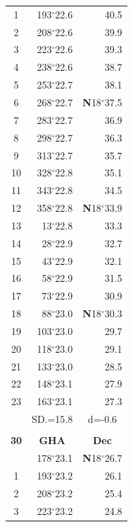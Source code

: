 \documentclass[10pt, a4paper]{report}
\begin{document}
\begin{scriptsize}
\begin{tabular*}{0.2\textwidth}[t]{@{\extracolsep{\fill}}|c|rr|}
1 & 193$^\circ$22.6 & 40.5\\
2 & 208$^\circ$22.6 & 39.9\\
3 & 223$^\circ$22.6 & \raisebox{0.24ex}{\boldmath$\cdot$~\boldmath$\cdot$~~}39.3\\
4 & 238$^\circ$22.6 & 38.7\\
5 & 253$^\circ$22.7 & 38.1\\[2Pt]
6 & 268$^\circ$22.7 & \textbf{N}18$^\circ$37.5\\
7 & 283$^\circ$22.7 & 36.9\\
8 & 298$^\circ$22.7 & 36.3\\
9 & 313$^\circ$22.7 & \raisebox{0.24ex}{\boldmath$\cdot$~\boldmath$\cdot$~~}35.7\\
10 & 328$^\circ$22.8 & 35.1\\
11 & 343$^\circ$22.8 & 34.5\\[2Pt]
12 & 358$^\circ$22.8 & \textbf{N}18$^\circ$33.9\\
13 & 13$^\circ$22.8 & 33.3\\
14 & 28$^\circ$22.9 & 32.7\\
15 & 43$^\circ$22.9 & \raisebox{0.24ex}{\boldmath$\cdot$~\boldmath$\cdot$~~}32.1\\
16 & 58$^\circ$22.9 & 31.5\\
17 & 73$^\circ$22.9 & 30.9\\[2Pt]
18 & 88$^\circ$23.0 & \textbf{N}18$^\circ$30.3\\
19 & 103$^\circ$23.0 & 29.7\\
20 & 118$^\circ$23.0 & 29.1\\
21 & 133$^\circ$23.0 & \raisebox{0.24ex}{\boldmath$\cdot$~\boldmath$\cdot$~~}28.5\\
22 & 148$^\circ$23.1 & 27.9\\
23 & 163$^\circ$23.1 & 27.3\\
\hline
\rule{0pt}{2.4ex} & \multicolumn{1}{c}{SD.=15.8} & \multicolumn{1}{c|}{d=-0.6}\\
\hline
\multicolumn{1}{c}{}\\[-0.5ex]\hline
\multicolumn{1}{|c|}{\rule{0pt}{2.6ex}\textbf{30}} & \multicolumn{1}{c}{\textbf{GHA}} & \multicolumn{1}{c|}{\textbf{Dec}}\\
\hline\rule{0pt}{2.6ex}\noindent
0 & 178$^\circ$23.1 & \textbf{N}18$^\circ$26.7\\
1 & 193$^\circ$23.2 & 26.1\\
2 & 208$^\circ$23.2 & 25.4\\
3 & 223$^\circ$23.2 & \raisebox{0.24ex}{\boldmath$\cdot$~\boldmath$\cdot$~~}24.8\\

\end{tabular*}
\end{scriptsize}
\end{document}
